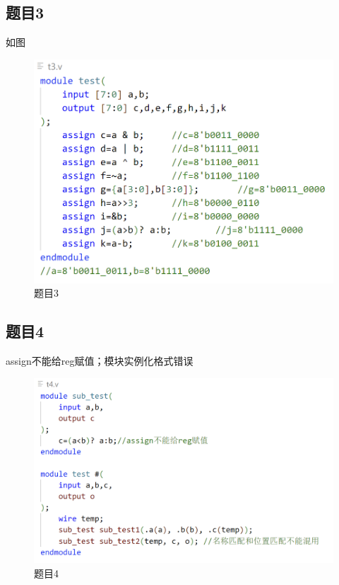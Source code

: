 \documentclass{article}
\begin{document}
    \subsection*{题目3} 如图
	\begin{figure}[htbp]
		\centering
		\includegraphics[scale=0.8]{t3.png}
		\caption*{题目3}
	\end{figure}
	\clearpage
    \subsection*{题目4}	assign不能给reg赋值；模块实例化格式错误
	\begin{figure}[htbp]
		\centering
		\includegraphics[scale=0.8]{t4.png}
		\caption*{题目4}
	\end{figure}
\end{document}
